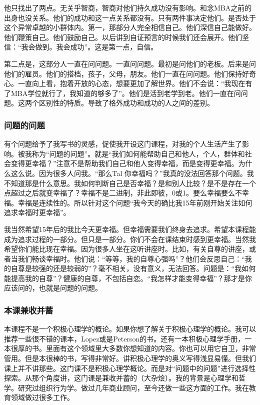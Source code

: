 他只找出了两点。无关乎智商，智商对他们持久成功没有影响。和念MBA之前的出身也没关系。他们的成功和这一点关系都没有。只有两件事决定他们。是否处于这个异常卓越的小群体内。第一，那部分人完全相信自己。他们深信自己能做好。他们鞭策自己。他们鼓励自己。以后讲到自证预言的时候我们还会展开。他们坚信：“我会做到。我会成功”。这是第一点，自信。

第二点是，这部分人一直在问问题。一直问问题。最初是问他们的老板。后来是问他们的雇员。他们的搭档，孩子，父母，朋友。他们一直在问问题。他们保持好奇心。一直向上看，抱着开放的心态，想要更加了解世界。他们不会说：“我现在有了MBA学位就行了，我知道的够多了”。他们是活到老学到老。他们一直在问问题。这两个区别性的特质。导致了格外成功和成功的人之间的差别。

\subsubsection{问题的问题}
有个问题给予了我写书的灵感，促使我开设这门课程，对我的个人生活产生了影响。被我称为“问题的问题”。就是“我们如何能帮助自己和他人，个人，群体和社会变得更幸福？”注意不是帮助我们自己和他人变得幸福，而是变得更幸福。为什么这么说。因为很多人问我。“那么Tal 你幸福吗？”我真的没法回答那个问题。我不知道那是什么意思。我如何判断自己是否幸福？是和别人比较？是不是存在一个点超过之后就变幸福了？幸福不是二进制，非此即彼，0或1。要么幸福要么不幸福。幸福是连续性的。所以针对这个问题“我今天的确比我15年前刚开始关注如何追求幸福时更幸福”。

我当然希望15年后的我比今天更幸福。但幸福需要我们终身去追求。希望本课程能成为追求过程的一部分。但只是一部分。你们不会在课结束时感到更幸福。当然我希望你们能比现在幸福。因为很多人坐在这听讲座时。比如，有关自尊的讲座，或者当我们畅谈幸福时。他们说：“等等，我的自尊心强吗”？他们会反思自己：“我的自尊是较强的还是较弱的”？毫不相关，没有意义，无法回答。问题是：“我如何能提高我的自尊”？健康的自尊，不包括自恋。“我怎样才能变得幸福”？那才是你应该问的，也就是问题的问题。

\subsubsection{本课兼收并蓄}
本课程不是一个积极心理学的概论。如果你想了解关于积极心理学的概论。我可以推荐一些很不错的课本，Lopez或是Peterson的书。还有一本积极心理学手册，一本很厚的书。里面有这个领域里大多数你想知道的内容。你也可以用它自卫，非常管用。但是本很棒的书，写得非常好。讲积极心理学的奥义写得浅显易懂。但我们课上并不讲那些。这门课不是积极心理学概论。而是对“问题中的问题”进行选择性探索。从那个角度讲，这门课是兼收并蓄的（大杂烩）。我的背景是心理学和哲学。研究过组织行为学。做过几年商业顾问，至今还做一些这方面的工作。我在教育领域做过很多工作。 

